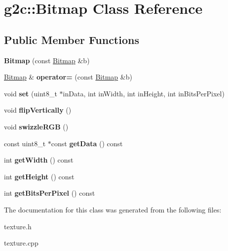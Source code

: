 \hypertarget{classg2c_1_1_bitmap}{
\section{g2c::Bitmap Class Reference}
\label{classg2c_1_1_bitmap}
}
\subsection*{Public Member Functions}
\begin{DoxyCompactItemize}
\item 
\hypertarget{classg2c_1_1_bitmap_a8edd9cbb2dd99fa8ec2d7ded1a5718ee}{
{\bfseries Bitmap} (const \hyperlink{classg2c_1_1_bitmap}{Bitmap} \&b)}
\label{classg2c_1_1_bitmap_a8edd9cbb2dd99fa8ec2d7ded1a5718ee}

\item 
\hypertarget{classg2c_1_1_bitmap_a3b7f1edc2a3cd9bd3dcf68804bbff4d0}{
\hyperlink{classg2c_1_1_bitmap}{Bitmap} \& {\bfseries operator=} (const \hyperlink{classg2c_1_1_bitmap}{Bitmap} \&b)}
\label{classg2c_1_1_bitmap_a3b7f1edc2a3cd9bd3dcf68804bbff4d0}

\item 
\hypertarget{classg2c_1_1_bitmap_aef6fb7178471500e97e2dd245e41ffe1}{
void {\bfseries set} (uint8\_\-t $\ast$inData, int inWidth, int inHeight, int inBitsPerPixel)}
\label{classg2c_1_1_bitmap_aef6fb7178471500e97e2dd245e41ffe1}

\item 
\hypertarget{classg2c_1_1_bitmap_a73e7df56fa893320c8cc01a6d2fcca02}{
void {\bfseries flipVertically} ()}
\label{classg2c_1_1_bitmap_a73e7df56fa893320c8cc01a6d2fcca02}

\item 
\hypertarget{classg2c_1_1_bitmap_a1fdc123e65643b93bfbe38f8e3ff3c3f}{
void {\bfseries swizzleRGB} ()}
\label{classg2c_1_1_bitmap_a1fdc123e65643b93bfbe38f8e3ff3c3f}

\item 
\hypertarget{classg2c_1_1_bitmap_a74b534c4709c94d4f5ed7600bc52b254}{
const uint8\_\-t $\ast$const {\bfseries getData} () const }
\label{classg2c_1_1_bitmap_a74b534c4709c94d4f5ed7600bc52b254}

\item 
\hypertarget{classg2c_1_1_bitmap_a91d0a9005ecb9d10014287c0af546a71}{
int {\bfseries getWidth} () const }
\label{classg2c_1_1_bitmap_a91d0a9005ecb9d10014287c0af546a71}

\item 
\hypertarget{classg2c_1_1_bitmap_a13d3a898544b15ac4bcea3e50d9e90d9}{
int {\bfseries getHeight} () const }
\label{classg2c_1_1_bitmap_a13d3a898544b15ac4bcea3e50d9e90d9}

\item 
\hypertarget{classg2c_1_1_bitmap_af4c8d434b9b64fd3446b4df1438600fe}{
int {\bfseries getBitsPerPixel} () const }
\label{classg2c_1_1_bitmap_af4c8d434b9b64fd3446b4df1438600fe}

\end{DoxyCompactItemize}


The documentation for this class was generated from the following files:\begin{DoxyCompactItemize}
\item 
texture.h\item 
texture.cpp\end{DoxyCompactItemize}
